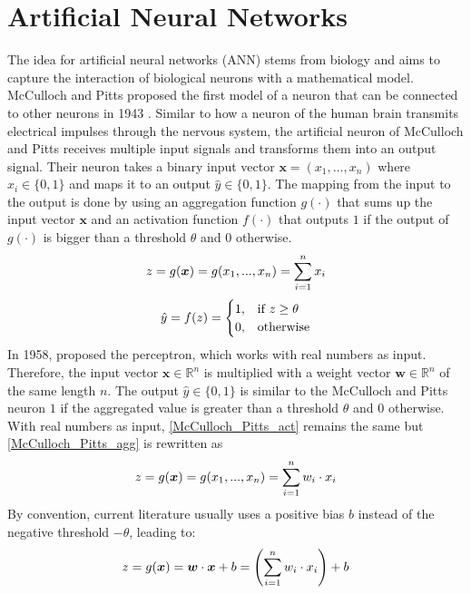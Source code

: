 \section{Artificial Neural Networks}
The idea for artificial neural networks (ANN) stems from biology and aims to capture the interaction of biological neurons with a mathematical model.
McCulloch and Pitts proposed the first model of a neuron that can be connected to other neurons in 1943 .
Similar to how a neuron of the human brain transmits electrical impulses through the nervous system, the artificial neuron of McCulloch and Pitts receives multiple input signals and transforms them into an output signal.
Their neuron takes a binary input vector $\boldsymbol{x} = (x_1, ..., x_n)$ where $x_i \in \{0, 1\}$ and maps it to an output $\hat{y} \in \{0, 1\}$.
The mapping from the input to the output is done by using an aggregation function $g(\cdot)$ that sums up the input vector $\boldsymbol{x}$ and an activation function $f(\cdot)$ that outputs $1$ if the output of $g(\cdot)$ is bigger than a threshold $\theta$ and $0$ otherwise.
%
\begin{align}\eqlbl{McCulloch_Pitts_agg}%
	z = g(\boldsymbol{x}) = g(x_1, ..., x_n) = \sum_{i=1}^{n}x_i
\end{align}
%
\begin{align}\eqlbl{McCulloch_Pitts_act}%
		\hat{y} = f(z) = \begin{cases}
      		1, & \text{if}\ z \geq \theta \\
      		0, & \text{otherwise}
    	\end{cases}
\end{align}
%
In 1958,  proposed the perceptron, which works with real numbers as input.
Therefore, the input vector $\boldsymbol{x} \in \mathbb{R}^n$ is multiplied with a weight vector $\boldsymbol{w} \in \mathbb{R}^n$ of the same length $n$.
The output $\hat{y} \in \{0, 1\}$ is similar to the McCulloch and Pitts neuron $1$ if the aggregated value is greater than a threshold $\theta$ and $0$ otherwise. With real numbers as input, \eqref{McCulloch_Pitts_act} remains the same but \eqref{McCulloch_Pitts_agg} is rewritten as
%
\begin{align}\eqlbl{Perceptron_agg}%
	z = g(\boldsymbol{x}) = g(x_1, ..., x_n) = \sum_{i=1}^{n} w_i \cdot x_i
\end{align}
%
By convention, current literature usually uses a positive bias $b$ instead of the negative threshold $- \theta$, leading to:
%
\begin{align}\eqlbl{nn}%
	z = g(\boldsymbol{x}) = \boldsymbol{w} \cdot \boldsymbol{x} + b = \left( \sum_{i=1}^{n}w_i \cdot x_i \right) + b
\end{align}
